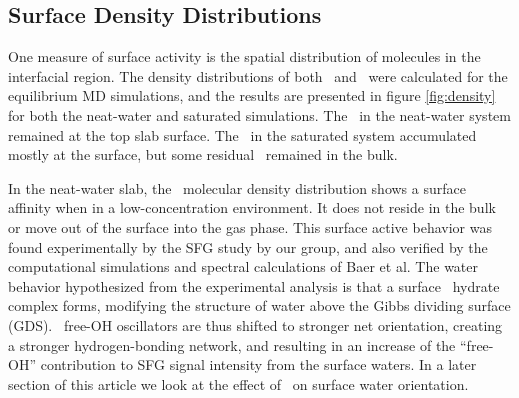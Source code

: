 \subsection{Surface Density Distributions}

One measure of surface activity is the spatial distribution of molecules in the interfacial region. The density distributions of both \wat~and \suldiox~were calculated for the equilibrium MD simulations, and the results are presented in figure \ref{fig:density} for both the neat-water and saturated simulations. The \suldiox~in the neat-water system remained at the top slab surface. The \suldiox~in the saturated system accumulated mostly at the surface, but some residual \suldiox~remained in the bulk.



In the neat-water slab, the \suldiox~molecular density distribution shows a surface affinity when in a low-concentration environment. It does not reside in the bulk or move out of the surface into the gas phase. This surface active behavior was found experimentally by the SFG study by our group,\cite{Tarbuck2005,Tarbuck2006} and also verified by the computational simulations and spectral calculations of Baer et al.\cite{Baer2010} The water behavior hypothesized from the experimental analysis is that a surface \suldiox~hydrate complex forms, modifying the structure of water above the Gibbs dividing surface (GDS). \wat~free-OH oscillators are thus shifted to stronger net orientation, creating a stronger hydrogen-bonding network, and resulting in an increase of the ``free-OH'' contribution to SFG signal intensity from the surface waters. In a later section of this article we look at the effect of \suldiox~on surface water orientation.

